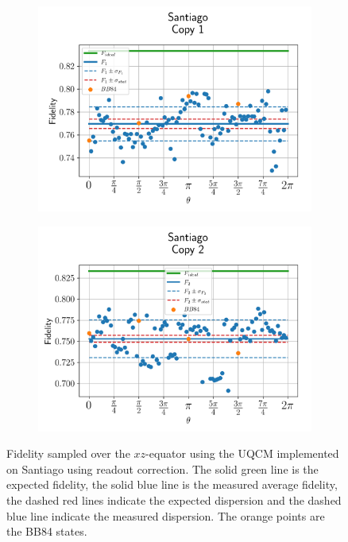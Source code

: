 \begin{figure}[H]
    \centering
    \begin{subfigure}{.45\textwidth}
      \centering
      \includegraphics[width=\textwidth]{Figures/UQCM/IBM/OnlyEquator/results_corrected_santiago_copy1.png}
    \end{subfigure}%
    \begin{subfigure}{.45\textwidth}
      \centering
      \includegraphics[width=\textwidth]{Figures/UQCM/IBM/OnlyEquator/results_corrected_santiago_copy2.png}
    \end{subfigure}
    \caption{Fidelity sampled over the $xz$-equator using the UQCM implemented on Santiago using readout correction. The solid green line is the expected fidelity, the solid blue line is the measured average fidelity, the dashed red lines indicate the expected dispersion and the dashed blue line indicate the measured dispersion. The orange points are the BB84 states.}
    \label{fig:uqcm_eq_our}
\end{figure}

